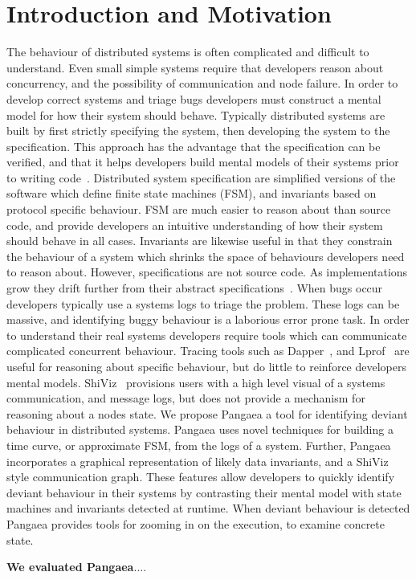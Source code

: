 \section{Introduction and Motivation}
\label{sec:intro}

The behaviour of distributed systems is often complicated and
difficult to understand. Even small simple systems require that
developers reason about concurrency, and the possibility of
communication and node failure. In order to develop correct systems
and triage bugs developers must construct a mental model for how
their system should behave. Typically distributed systems are built by
first strictly specifying the system, then developing the system to the
specification. This approach has the advantage that the specification
can be verified, and that it helps developers build mental models of
their systems prior to writing
code~\cite{Newcombe:2015:AWS:2749359.2699417,WilcoxWPTWEA2015}.
Distributed system specification are simplified versions of the
software which define finite state machines (FSM), and invariants
based on protocol specific behaviour. FSM are much easier to reason
about than source code, and provide developers an intuitive
understanding of how their system should behave in all cases.
Invariants are likewise useful in that they constrain the behaviour of
a system which shrinks the space of behaviours developers need to
reason about. However, specifications are not source code. As
implementations grow they drift further from their abstract
specifications~\cite{917525}. When bugs occur developers typically use
a systems logs to triage the problem. These logs can be massive, and
identifying buggy behaviour is a laborious error prone task.  In order
to understand their real systems developers require tools which can
communicate complicated concurrent behaviour. Tracing tools such as
Dapper~\cite{36356}, and Lprof~\cite{Zhao:2014:LNR:2685048.2685099}
are useful for reasoning about specific behaviour, but do little to
reinforce developers mental models. ShiViz~\cite{BeschastnikhWBE2016}
provisions users with a high level visual of a systems communication,
and message logs, but does not provide a mechanism for reasoning about
a nodes state. We propose Pangaea a tool for identifying deviant
behaviour in distributed systems. Pangaea uses novel techniques for
building a time curve, or approximate FSM, from the logs of a system.
Further, Pangaea incorporates a graphical representation of likely
data invariants, and a ShiViz style communication graph. These
features allow developers to quickly identify deviant behaviour in
their systems by contrasting their mental model with state machines
and invariants detected at runtime. When deviant behaviour is detected
Pangaea provides tools for zooming in on the execution, to examine
concrete state.



\textbf{We evaluated Pangaea$\dots$}.
